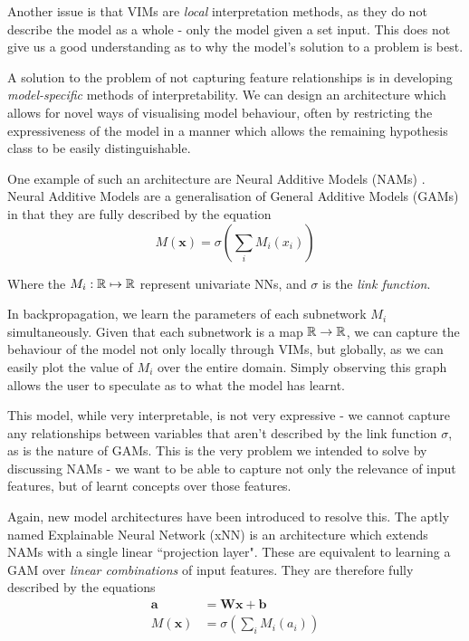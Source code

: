 \documentclass[conference]{report}
\begin{document}
Another issue is that VIMs are \textit{local} interpretation methods, as they do not describe the model as a whole - only the model given a set input. This does not give us a good understanding as to why the model's solution to a problem is best.

A solution to the problem of not capturing feature relationships is in developing \textit{model-specific} methods of interpretability. We can design an architecture which allows for novel ways of visualising model behaviour, often by restricting the expressiveness of the model in a manner which allows the remaining hypothesis class to be easily distinguishable. 

One example of such an architecture are Neural Additive Models (NAMs) \cite{neuraladditive}. Neural Additive Models are a generalisation of General Additive Models (GAMs) in that they are fully described by the equation
$$M(\mathbf{x}) = \sigma\left(\sum_i M_i(x_i)\right)$$

Where the $M_i:\mathbb{R} \mapsto \mathbb{R}$ represent univariate NNs, and $\sigma$ is the \textit{link function}.

In backpropagation, we learn the parameters of each subnetwork $M_i$ simultaneously. Given that each subnetwork is a map $\mathbb{R} \to \mathbb{R}$, we can capture the behaviour of the model not only locally through VIMs, but globally, as we can easily plot the value of $M_i$ over the entire domain. Simply observing this graph allows the user to speculate as to what the model has learnt.

This model, while very interpretable, is not very expressive - we cannot capture any relationships between variables that aren't described by the link function $\sigma$, as is the nature of GAMs. This is the very problem we intended to solve by discussing NAMs - we want to be able to capture not only the relevance of input features, but of learnt concepts over those features.

Again, new model architectures have been introduced to resolve this. The aptly named Explainable Neural Network (xNN) \cite{xnn} is an architecture which extends NAMs with a single linear ``projection layer". These are equivalent to learning a GAM over \textit{linear combinations} of input features. They are therefore fully described by the equations
$$
\begin{aligned}
\mathbf{a} &= \mathbf{Wx + b}\\
M(\mathbf{x}) &= \sigma\left(\sum_i M_i(a_i)\right)
\end{aligned}
$$
\end{document}
